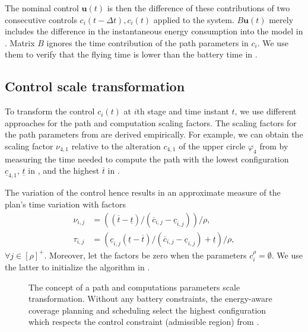 The nominal control $\mathbf{u}(t)$ is then the difference of these contributions of two consecutive controls $c_i(t-\Delta t),c_i(t)$ applied to the system. 
$B\mathbf{u}(t)$ merely includes the difference in the instantaneous energy consumption into the model in . Matrix $B$ ignores the time contribution of the path parameters in $c_i$. We use them to verify that the flying time is lower than the battery time in .

\subsection{Control scale transformation}
\label{sec:merging}

To transform the control $c_i(t)$ at $i$th stage and time instant $t$, we use different approaches for the path and computation scaling factors.
The scaling factors for the path parameters from  are derived empirically. For example, we can obtain the scaling factor $\nu_{4,1}$ relative to the alteration $c_{4,1}$ of the upper circle $\varphi_4$ from  by measuring the time needed to compute the path with the lowest configuration $\underline{c}_{4,1}$, $\underline{t}$ in , and the highest $\overline{t}$ in . 

The variation of the control hence results in an approximate measure of the plan's time variation with factors
\begin{subequations}\label{eq:scale-traj}\begin{align}
  \nu_{i,j}&=\left((\overline{t}-\underline{t})/(\overline{c}_{i,j}-\underline{c}_{i,j})\right)/\rho,\\
  \tau_{i,j}&=\left(\underline{c}_{i,j}(\underline{t}-\overline{t})/(\overline{c}_{i,j}-\underline{c}_{i,j})+\underline{t}\right)/\rho,
\end{align}\end{subequations} 
$\forall j\in[\rho]^+$. Moreover, let the factors be zero when the parameters $c_i^\rho=\emptyset$. We use the latter to initialize the algorithm in .

\begin{figure}[h!]
  \sfr
  \centering
  \selectfont
  
  \caption[Concept of a path and computations parameters scale transformation]{The concept of a path and computations parameters scale transformation. Without any battery constraints, the energy-aware coverage planning and scheduling select the highest configuration which respects the control constraint (admissible region) from .}
  \label{fig:plot-6}
  \efr
\end{figure}

